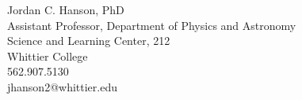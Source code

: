 \documentclass[../main.tex]{subfiles}
\begin{document}
Jordan C. Hanson, PhD \\
Assistant Professor, Department of Physics and Astronomy \\
Science and Learning Center, 212 \\
Whittier College \\
562.907.5130 \\
jhanson2@whittier.edu
\end{document}
